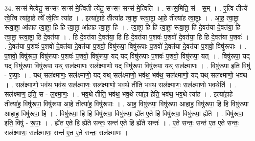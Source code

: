 \documentclass[17pt]{extarticle}
\begin{document}
34. सꣳस॑ मेत्वेतु॒ सꣳसꣳ॒॒ सꣳस॑ मे॒त्विती त्ये॑तु॒ सꣳसꣳ॒॒ सꣳस॑ मे॒त्विति॑ । . सꣳस॒मिति॒ सं - स॒म् । . ए॒त्वि तीत्ये᳚ त्वे॒त्वि त्या॑हा॒हे त्ये᳚ त्वे॒त्वि त्या॑ह । . इत्या॑हा॒हे तीत्या॑ह त्वा॒ष्ट्रा स्त्वा॒ष्ट्रा आ॒हे तीत्या॑ह त्वा॒ष्ट्राः । . आ॒ह॒ त्वा॒ष्ट्रा स्त्वा॒ष्ट्रा आ॑हाह त्वा॒ष्ट्रा हि हि त्वा॒ष्ट्रा आ॑हाह त्वा॒ष्ट्रा हि । . त्वा॒ष्ट्रा हि हि त्वा॒ष्ट्रा स्त्वा॒ष्ट्रा हि दे॒वत॑या दे॒वत॑या॒ हि त्वा॒ष्ट्रा स्त्वा॒ष्ट्रा हि दे॒वत॑या । . हि दे॒वत॑या दे॒वत॑या॒ हि हि दे॒वत॑या प॒शवः॑ प॒शवो॑ दे॒वत॑या॒ हि हि दे॒वत॑या प॒शवः॑ । . दे॒वत॑या प॒शवः॑ प॒शवो॑ दे॒वत॑या दे॒वत॑या प॒शवो॒ विषु॑रूपा॒ विषु॑रूपाः प॒शवो॑ दे॒वत॑या दे॒वत॑या प॒शवो॒ विषु॑रूपाः । . प॒शवो॒ विषु॑रूपा॒ विषु॑रूपाः प॒शवः॑ प॒शवो॒ विषु॑रूपा॒ यद् यद् विषु॑रूपाः प॒शवः॑ प॒शवो॒ विषु॑रूपा॒ यत् । . विषु॑रूपा॒ यद् यद् विषु॑रूपा॒ विषु॑रूपा॒ यथ् सल॑क्ष्माणः॒ सल॑क्ष्माणो॒ यद् विषु॑रूपा॒ विषु॑रूपा॒ यथ् सल॑क्ष्माणः । . विषु॑रूपा॒ इति॒ विषु॑ - रू॒पाः॒ । . यथ् सल॑क्ष्माणः॒ सल॑क्ष्माणो॒ यद् यथ् सल॑क्ष्माणो॒ भव॑थ॒ भव॑थ॒ सल॑क्ष्माणो॒ यद् यथ् सल॑क्ष्माणो॒ भव॑थ । . सल॑क्ष्माणो॒ भव॑थ॒ भव॑थ॒ सल॑क्ष्माणः॒ सल॑क्ष्माणो॒ भव॒थे तीति॒ भव॑थ॒ सल॑क्ष्माणः॒ सल॑क्ष्माणो॒ भव॒थेति॑ । . सल॑क्ष्माण॒ इति॒ स - ल॒क्ष्मा॒णः॒ । . भव॒थे तीति॒ भव॑थ॒ भव॒थे त्या॑हा॒ हेति॒ भव॑थ॒ भव॒थे त्या॑ह । . इत्या॑हा॒हे तीत्या॑ह॒ विषु॑रूपा॒ विषु॑रूपा आ॒हे तीत्या॑ह॒ विषु॑रूपाः । . आ॒ह॒ विषु॑रूपा॒ विषु॑रूपा आहाह॒ विषु॑रूपा॒ हि हि विषु॑रूपा आहाह॒ विषु॑रूपा॒ हि । . विषु॑रूपा॒ हि हि विषु॑रूपा॒ विषु॑रूपा॒ ह्ये॑त ए॒ते हि विषु॑रूपा॒ विषु॑रूपा॒ ह्ये॑ते । . विषु॑रूपा॒ इति॒ विषु॑ - रू॒पाः॒ । . ह्ये॑त ए॒ते हि ह्ये॑ते सन्तः॒ सन्त॑ ए॒ते हि ह्ये॑ते सन्तः॑ । . ए॒ते सन्तः॒ सन्त॑ ए॒त ए॒ते सन्तः॒ सल॑क्ष्माणः॒ सल॑क्ष्माणः॒ सन्त॑ ए॒त ए॒ते सन्तः॒ सल॑क्ष्माणः । \newline
\end{document}
